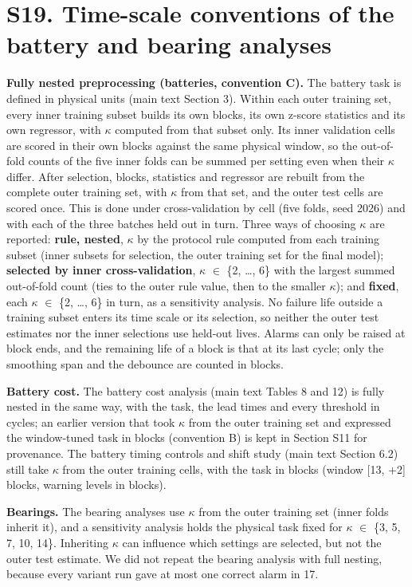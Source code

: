 \documentclass[11pt,a4paper]{article}
\begin{document}
\section*{S19. Time-scale conventions of the battery and bearing analyses}

\noindent \textbf{Fully nested preprocessing (batteries, convention C).} The battery task is defined in physical units (main text Section 3). Within each outer training set, every inner training subset builds its own blocks, its own z-score statistics and its own regressor, with $\kappa$ computed from that subset only. Its inner validation cells are scored in their own blocks against the same physical window, so the out-of-fold counts of the five inner folds can be summed per setting even when their $\kappa$ differ. After selection, blocks, statistics and regressor are rebuilt from the complete outer training set, with $\kappa$ from that set, and the outer test cells are scored once. This is done under cross-validation by cell (five folds, seed 2026) and with each of the three batches held out in turn. Three ways of choosing $\kappa$ are reported: \textbf{rule, nested}, $\kappa$ by the protocol rule computed from each training subset (inner subsets for selection, the outer training set for the final model); \textbf{selected by inner cross-validation}, $\kappa$ $\in$ \{2, \ldots{}, 6\} with the largest summed out-of-fold count (ties to the outer rule value, then to the smaller $\kappa$); and \textbf{fixed}, each $\kappa$ $\in$ \{2, \ldots{}, 6\} in turn, as a sensitivity analysis. No failure life outside a training subset enters its time scale or its selection, so neither the outer test estimates nor the inner selections use held-out lives. Alarms can only be raised at block ends, and the remaining life of a block is that at its last cycle; only the smoothing span and the debounce are counted in blocks.

\noindent \textbf{Battery cost.} The battery cost analysis (main text Tables 8 and 12) is fully nested in the same way, with the task, the lead times and every threshold in cycles; an earlier version that took $\kappa$ from the outer training set and expressed the window-tuned task in blocks (convention B) is kept in Section S11 for provenance. The battery timing controls and shift study (main text Section 6.2) still take $\kappa$ from the outer training cells, with the task in blocks (window [\textminus{}13, +2] blocks, warning levels in blocks).

\noindent \textbf{Bearings.} The bearing analyses use $\kappa$ from the outer training set (inner folds inherit it), and a sensitivity analysis holds the physical task fixed for $\kappa$ $\in$ \{3, 5, 7, 10, 14\}. Inheriting $\kappa$ can influence which settings are selected, but not the outer test estimate. We did not repeat the bearing analysis with full nesting, because every variant run gave at most one correct alarm in 17.
\end{document}
